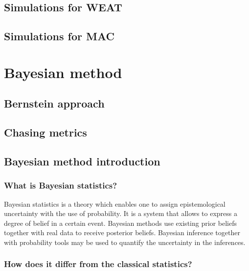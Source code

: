 \documentclass[
  10pt,
  dvipsnames,enabledeprecatedfontcommands, twocolumn]{scrartcl}
\begin{document}
\hypertarget{simulations-for-weat}{%
\subsection{Simulations for WEAT}\label{simulations-for-weat}}

\hypertarget{simulations-for-mac}{%
\subsection{Simulations for MAC}\label{simulations-for-mac}}

\hypertarget{bayesian-method}{%
\section{Bayesian method}\label{bayesian-method}}

\hypertarget{bernstein-approach}{%
\subsection{Bernstein approach}\label{bernstein-approach}}

\hypertarget{chasing-metrics}{%
\subsection{Chasing metrics}\label{chasing-metrics}}

\hypertarget{bayesian-method-introduction}{%
\subsection{Bayesian method
introduction}\label{bayesian-method-introduction}}

\hypertarget{what-is-bayesian-statistics}{%
\subsubsection{What is Bayesian
statistics?}\label{what-is-bayesian-statistics}}

Bayesian statistics is a theory which enables one to assign
epistemological uncertainty with the use of probability. It is a system
that allows to express a degree of belief in a certain event. Bayesian
methods use existing prior beliefs together with real data to receive
posterior beliefs. Bayesian inference together with probability tools
may be used to quantify the uncertainty in the inferences.

\hypertarget{how-does-it-differ-from-the-classical-statistics}{%
\subsubsection{How does it differ from the classical
statistics?}\label{how-does-it-differ-from-the-classical-statistics}}
\end{document}
